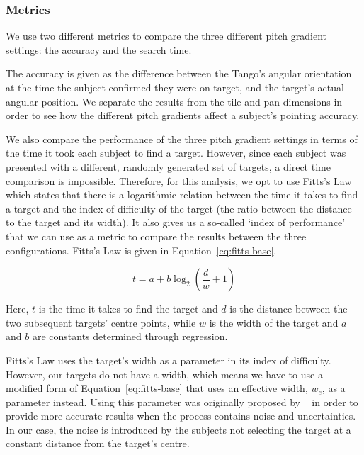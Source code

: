 \documentclass[format=sigconf, review=true, screen=true, anonymous=true]{acmart}
\begin{document}
\subsubsection{Metrics}

We use two different metrics to compare the three different pitch gradient settings: the accuracy and the search time. 

The accuracy is given as the difference between the Tango's angular orientation at the time the subject confirmed they were on target, and the target's actual angular position. We separate the results from the tile and pan dimensions in order to see how the different pitch gradients affect a subject's pointing accuracy. 


We also compare the performance of the three pitch gradient settings in terms of the time it took each subject to find a target. However, since each subject was presented with a different, randomly generated set of targets, a direct time comparison is impossible. Therefore, for this analysis, we opt to use Fitts's Law~\cite{fitts1954information} which states that there is a logarithmic relation between the time it takes to find a target and the index of difficulty of the target (the ratio between the distance to the target and its width). It also gives us a so-called `index of performance' that we can use as a metric to compare the results between the three configurations. Fitts's Law is given in Equation~\ref{eq:fitts-base}. 

\begin{equation}
  \label{eq:fitts-base}
  t = a + b\log_2\left(\frac{d}{w} + 1\right)
\end{equation}

Here, $t$ is the time it takes to find the target and $d$ is the distance between the two subsequent targets' centre points, while $w$ is the width of the target and $a$ and $b$ are constants determined through regression.

Fitts's Law uses the target's width as a parameter in its index of difficulty. However, our targets do not have a width, which means we have to use a modified form of Equation~\ref{eq:fitts-base} that uses an effective width, $w_e$, as a parameter instead. Using this parameter was originally proposed by \citeauthor{mackenzie1992fitts}~\cite{mackenzie1992fitts} in order to provide more accurate results when the process contains noise and uncertainties. In our case, the noise is introduced by the subjects not selecting the target at a constant distance from the target's centre. 
\end{document}
